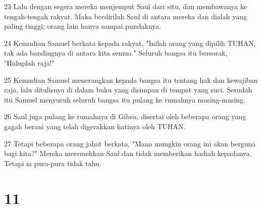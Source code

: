\par 23 Lalu dengan segera mereka menjemput Saul dari situ, dan membawanya ke tengah-tengah rakyat. Maka berdirilah Saul di antara mereka dan dialah yang paling tinggi; orang lain hanya sampai pundaknya.
\par 24 Kemudian Samuel berkata kepada rakyat, "Inilah orang yang dipilih TUHAN, tak ada bandingnya di antara kita semua." Seluruh bangsa itu bersorak, "Hiduplah raja!"
\par 25 Kemudian Samuel menerangkan kepada bangsa itu tentang hak dan kewajiban raja, lalu ditulisnya di dalam buku yang disimpan di tempat yang suci. Sesudah itu Samuel menyuruh seluruh bangsa itu pulang ke rumahnya masing-masing.
\par 26 Saul juga pulang ke rumahnya di Gibea, disertai oleh beberapa orang yang gagah berani yang telah digerakkan hatinya oleh TUHAN.
\par 27 Tetapi beberapa orang jahat berkata, "Mana mungkin orang ini akan berguna bagi kita?" Mereka meremehkan Saul dan tidak memberikan hadiah kepadanya. Tetapi ia pura-pura tidak tahu.

\chapter{11}

